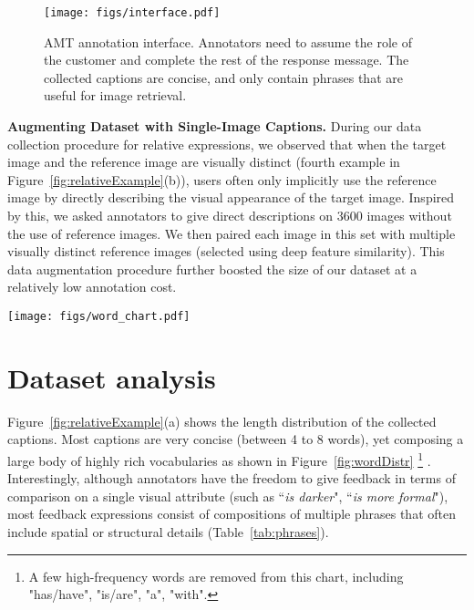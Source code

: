 \begin{figure}
\begin{center}
\texttt{[image: figs/interface.pdf]}
\caption{AMT annotation interface. Annotators need to assume the role of the customer and
 complete the rest of the response message. The collected captions are concise,
and only contain phrases that are useful for image retrieval.}
\label{fig:amtInterface}
\end{center}
\end{figure} 

\textbf{Augmenting Dataset with Single-Image Captions.} 
During our data collection procedure for relative expressions, 
we observed that when the target image and the reference image are 
visually distinct (fourth example in Figure~\ref{fig:relativeExample}(b)), 
users often only implicitly use the reference image by directly describing
the visual appearance of the target image. 
Inspired by this, we asked annotators to give 
direct descriptions on $3600$ images without the use of reference images. 
We then paired each image in this set with 
multiple visually distinct reference images (selected 
using deep feature similarity). This data augmentation procedure further 
boosted the size of our dataset at a relatively low annotation cost. 

\begin{figure*}
\centering
\texttt{[image: figs/word\_chart.pdf]}
\caption{Visualization of the rich vocabulary discovered from the 
relative captioning dataset. The size of each rectangle is proportional to the word count of the corresponding
word. }
\label{fig:wordDistr}

\end{figure*}

\section{Dataset analysis}
\label{sec:dataset_analysis}

Figure~\ref{fig:relativeExample}(a) shows the length distribution of the collected
captions. Most captions are very concise (between 4 to 8 words), yet composing
a large body of highly rich vocabularies as shown in Figure~\ref{fig:wordDistr}
\footnote{A few high-frequency words are removed from this chart, 
including "has/have", "is/are", "a", "with".} .
Interestingly, although annotators have 
the freedom to give feedback in terms of comparison on 
a single visual attribute (such as ``\emph{is darker}", 
``\emph{is more formal}"), most feedback expressions consist of 
compositions of multiple phrases that often include spatial or structural details (Table~\ref{tab:phrases}). 

